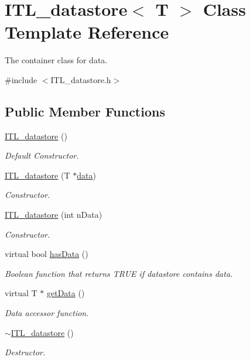 \hypertarget{classITL__datastore}{
\section{ITL\_\-datastore$<$ T $>$ Class Template Reference}
\label{classITL__datastore}
}


The container class for data.  




{\ttfamily \#include $<$ITL\_\-datastore.h$>$}

\subsection*{Public Member Functions}
\begin{DoxyCompactItemize}
\item 
\hyperlink{classITL__datastore_a1da115b3d395ac0482d2b0c980a2384f}{ITL\_\-datastore} ()
\begin{DoxyCompactList}\small\item\em Default Constructor. \item\end{DoxyCompactList}\item 
\hyperlink{classITL__datastore_a3beff9f7ee4e7ce2a65cc3bce3418b99}{ITL\_\-datastore} (T $\ast$\hyperlink{MainIT__regvector_8cpp_a783b2b1c03f80ec0d3ed965238d6bd65}{data})
\begin{DoxyCompactList}\small\item\em Constructor. \item\end{DoxyCompactList}\item 
\hyperlink{classITL__datastore_a017cff7441532e53a2a0897cc8790e3a}{ITL\_\-datastore} (int nData)
\begin{DoxyCompactList}\small\item\em Constructor. \item\end{DoxyCompactList}\item 
virtual bool \hyperlink{classITL__datastore_a43b1843d9ccedc71295116de3d31edb0}{hasData} ()
\begin{DoxyCompactList}\small\item\em Boolean function that returns TRUE if datastore contains data. \item\end{DoxyCompactList}\item 
virtual T $\ast$ \hyperlink{classITL__datastore_ac5d73b1499462140fafa2ca90634c721}{getData} ()
\begin{DoxyCompactList}\small\item\em Data accessor function. \item\end{DoxyCompactList}\item 
\hyperlink{classITL__datastore_a4691b58e9218237b709195d8f2a811eb}{$\sim$ITL\_\-datastore} ()
\begin{DoxyCompactList}\small\item\em Destructor. \item\end{DoxyCompactList}\end{DoxyCompactItemize}
